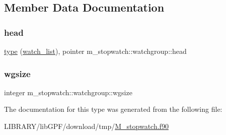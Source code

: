 \subsection{Member Data Documentation}
\mbox{\label{structm__stopwatch_1_1watchgroup_adf624a85ac607be3ec647d44ddb8fd1e}} 
\subsubsection{\texorpdfstring{head}{head}}
{\footnotesize\ttfamily \hyperlink{stop__watch_83_8txt_a70f0ead91c32e25323c03265aa302c1c}{type} (\hyperlink{structm__stopwatch_1_1watch__list}{watch\+\_\+list}), pointer m\+\_\+stopwatch\+::watchgroup\+::head}

\mbox{\label{structm__stopwatch_1_1watchgroup_a3ecaf14bd4981f9793c7e6b524632c16}} 
\subsubsection{\texorpdfstring{wgsize}{wgsize}}
{\footnotesize\ttfamily integer m\+\_\+stopwatch\+::watchgroup\+::wgsize}



The documentation for this type was generated from the following file\+:\begin{DoxyCompactItemize}
\item 
L\+I\+B\+R\+A\+R\+Y/lib\+G\+P\+F/download/tmp/\hyperlink{M__stopwatch_8f90}{M\+\_\+stopwatch.\+f90}\end{DoxyCompactItemize}
